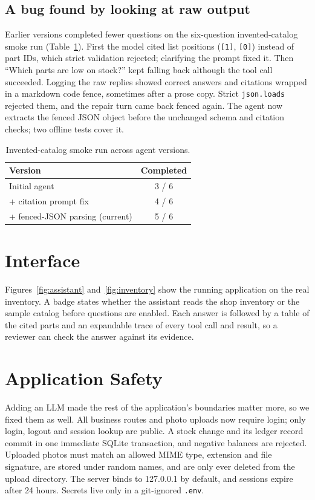 \documentclass[10pt,twocolumn,a4paper]{article}
\newcommand{\code}[1]{\texttt{#1}}
\begin{document}
\subsection{A bug found by looking at raw output}

Earlier versions completed fewer questions on the six-question invented-catalog smoke run (Table~\ref{tab:history}). First the model cited list positions (\code{[1]}, \code{[0]}) instead of part IDs, which strict validation rejected; clarifying the prompt fixed it. Then ``Which parts are low on stock?'' kept falling back although the tool call succeeded. Logging the raw replies showed correct answers and citations wrapped in a markdown code fence, sometimes after a prose copy. Strict \code{json.loads} rejected them, and the repair turn came back fenced again. The agent now extracts the fenced JSON object before the unchanged schema and citation checks; two offline tests cover it.

\begin{table}[t]
\caption{Invented-catalog smoke run across agent versions.}
\label{tab:history}
\centering\small
\begin{tabular}{@{}p{45mm}c@{}}
\toprule
Version & Completed \\
\midrule
Initial agent & 3 / 6 \\
+ citation prompt fix & 4 / 6 \\
+ fenced-JSON parsing (current) & 5 / 6 \\
\bottomrule
\end{tabular}
\end{table}

\section{Interface}

Figures~\ref{fig:assistant} and~\ref{fig:inventory} show the running application on the real inventory. A badge states whether the assistant reads the shop inventory or the sample catalog before questions are enabled. Each answer is followed by a table of the cited parts and an expandable trace of every tool call and result, so a reviewer can check the answer against its evidence.

\section{Application Safety}

Adding an LLM made the rest of the application's boundaries matter more, so we fixed them as well. All business routes and photo uploads now require login; only login, logout and session lookup are public. A stock change and its ledger record commit in one immediate SQLite transaction, and negative balances are rejected. Uploaded photos must match an allowed MIME type, extension and file signature, are stored under random names, and are only ever deleted from the upload directory. The server binds to 127.0.0.1 by default, and sessions expire after 24 hours. Secrets live only in a git-ignored \code{.env}.
\end{document}

